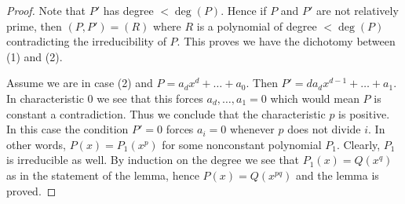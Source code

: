 \documentclass[10pt,a4paper]{amsart}
\theoremstyle{plain}
\theoremstyle{definition}
\theoremstyle{remark}
\numberwithin{equation}{subsection}
\begin{document}
\begin{proof}
Note that $P'$ has degree $< \deg(P)$. Hence if $P$ and $P'$ are not relatively
prime, then $(P, P') = (R)$ where $R$ is a polynomial of degree $< \deg(P)$
contradicting the irreducibility of $P$. This proves we have the dichotomy
between (1) and (2).

\medskip\noindent
Assume we are in case (2) and $P = a_d x^d + \ldots + a_0$. Then
$P' = da_d x^{d - 1} + \ldots + a_1$. In characteristic $0$ we see
that this forces $a_d, \ldots, a_1 = 0$ which would mean $P$ is constant
a contradiction. Thus we conclude that the characteristic $p$ is positive.
In this case the condition $P' = 0$ forces $a_i = 0$ whenever $p$ does
not divide $i$.
In other words, $P(x) = P_1(x^p)$ for some nonconstant polynomial $P_1$.
Clearly, $P_1$ is irreducible as well. By induction on the degree we
see that $P_1(x) = Q(x^q)$ as in the statement of the lemma, hence
$P(x) = Q(x^{pq})$ and the lemma is proved.
\end{proof}
\end{document}
